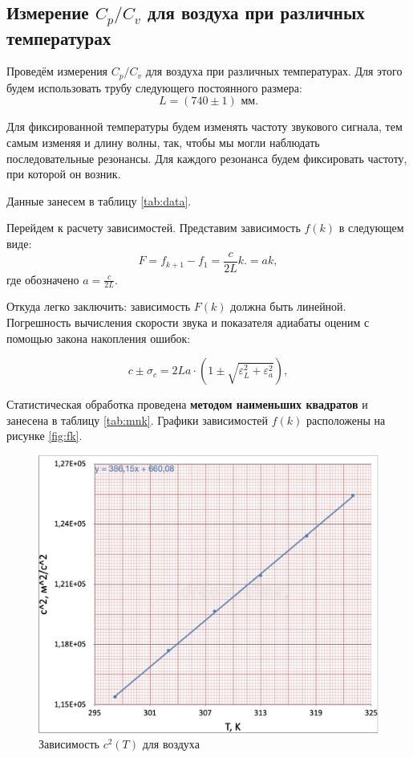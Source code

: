 \documentclass[12pt,a4paper]{article}
\begin{document}
\subsection*{Измерение $C_p/C_v$ для воздуха при различных температурах}

Проведём измерения $C_p/C_v$ для воздуха при различных температурах.
Для этого будем использовать трубу следующего постоянного размера:
$$L = (740 \pm 1) \text{ мм}.$$

Для фиксированной температуры будем изменять частоту звукового сигнала, тем самым изменяя и длину волны, так, чтобы мы могли наблюдать последовательные резонансы. Для каждого резонанса будем фиксировать частоту, при которой он возник. 

Данные занесем в таблицу \ref{tab:data}.

Перейдем к расчету зависимостей. Представим зависимость $f(k)$ в следующем виде:
$$F = f_{k+1} - f_1= \frac{c}{2L}k. = ak,$$
где обозначено $a = \frac{c}{2L}$.

Откуда легко заключить: зависимость $F(k)$ должна быть линейной.
Погрешность вычисления скорости звука и показателя адиабаты оценим с помощью закона накопления ошибок:


$$c \pm \sigma_c = 2La \cdot \left(1 \pm \sqrt{\varepsilon_L^2 + \varepsilon_a^2}\right),$$


Статистическая обработка проведена \textbf{методом наименьших квадратов} и занесена в таблицу \ref{tab:mnk}.
Графики зависимостей $f(k)$ расположены на рисунке \ref{fig:fk}.


\begin{figure}[H]
	\includegraphics[width = 10.93 cm]{src/c^2(T).pdf}
	\caption{Зависимость $c^2(T)$ для воздуха}
	\label{fig:ct}
\end{figure}
\end{document}
